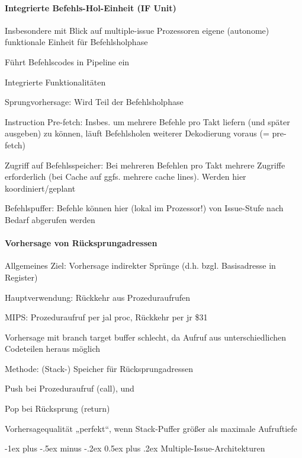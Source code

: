\documentclass[10pt,landscape]{article}
\makeatletter
\renewcommand{\section}{\@startsection{section}{1}{0mm}%
                                {-1ex plus -.5ex minus -.2ex}%
                                {0.5ex plus .2ex}%
                                {\normalfont\large\bfseries}}
\makeatother
\begin{document}
\begin{multicols}{3}
  \paragraph{ Integrierte Befehls-Hol-Einheit (IF Unit)}
  Insbesondere mit Blick auf multiple-issue Prozessoren eigene (autonome) funktionale Einheit für Befehlsholphase
  \begin{itemize*}
    \item Führt Befehlscodes in Pipeline ein
    \item Integrierte Funktionalitäten
    \item Sprungvorhersage: Wird Teil der Befehlsholphase
    \item Instruction Pre-fetch: Insbes. um mehrere Befehle pro Takt liefern (und später ausgeben) zu können, läuft Befehlsholen weiterer Dekodierung voraus (= pre-fetch)
    \item Zugriff auf Befehlsspeicher: Bei mehreren Befehlen pro Takt mehrere Zugriffe erforderlich (bei Cache auf ggfs. mehrere cache lines). Werden hier koordiniert/geplant
    \item Befehlspuffer: Befehle können hier (lokal im Prozessor!) von Issue-Stufe nach Bedarf abgerufen werden
  \end{itemize*}
  
  \paragraph{ Vorhersage von Rücksprungadressen}
  Allgemeines Ziel: Vorhersage indirekter Sprünge (d.h. bzgl. Basisadresse in Register)
  \begin{itemize*}
    \item Hauptverwendung: Rückkehr aus Prozeduraufrufen
    \item MIPS: Prozeduraufruf per jal proc, Rückkehr per jr \$31
    \item Vorhersage mit branch target buffer schlecht, da Aufruf aus unterschiedlichen Codeteilen heraus möglich
    \item Methode: (Stack-) Speicher für Rücksprungadressen
    \item Push bei Prozeduraufruf (call), und
    \item Pop bei Rücksprung (return)
    \item Vorhersagequalität „perfekt“, wenn Stack-Puffer größer als maximale Aufruftiefe
  \end{itemize*}
  
  
  \section{ Multiple-Issue-Architekturen}

\end{multicols}
\end{document}
